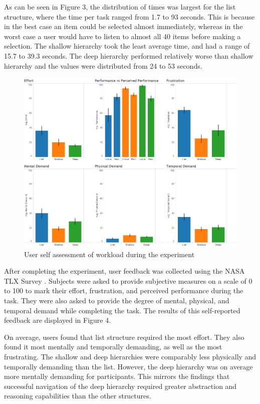 \documentclass{sigchi}
\begin{document}
As can be seen in Figure 3, the distribution of times was largest for the list structure, where the time per task ranged from 1.7 to 93 seconds. This is because in the best case an item could be selected almost immediately, whereas in the worst case a user would have to listen to almost all 40 items before making a selection. The shallow hierarchy took the least average time, and had a range of 15.7 to 39.3 seconds. The deep hierarchy performed relatively worse than shallow hierarchy and the values were distributed from 24 to 53 seconds. 

\begin{figure}[!h]
    \centering
    \includegraphics[width=0.9\columnwidth]{fig_nasaSummary}
    \caption{User self assessment of workload during the experiment}
    \label{fig: Figure4}
\end{figure}

After completing the experiment, user feedback was collected using the NASA TLX Survey \cite{NASA1986}. Subjects were asked to provide subjective measures on a scale of 0 to 100 to mark their effort, frustration, and perceived performance during the task. They were also asked to provide the degree of mental, physical, and temporal demand while completing the task. The results of this self-reported feedback are displayed in Figure 4.


On average, users found that list structure required the most effort. They also found it most mentally and temporally demanding, as well as the most frustrating. The shallow and deep hierarchies were comparably less physically and temporally demanding than the list. However, the deep hierarchy was on average more mentally demanding for participants. This mirrors the findings \cite{Medhi2013a} that successful navigation of the deep hierarchy required greater abstraction and reasoning capabilities than the other structures.
\end{document}
